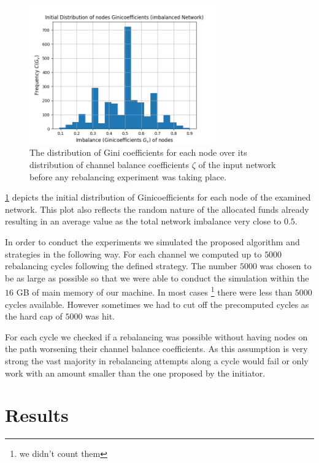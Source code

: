 \documentclass[a4paper]{paper}
\begin{document}
\begin{figure}
 \centering
 \includegraphics[width=8cm]{code/vs/fig/initial_ginis_before_rebalancing.png}
 \caption{The distribution of Gini coefficients for each node over its distribution of channel balance coefficients $\zeta$ of the input network before any rebalancing experiment was taking place.}
 \label{fig:initial_ginis}
\end{figure}
\cref{fig:initial_ginis} depicts the initial distribution of Ginicoefficients for each node of the examined network.
This plot also reflects the random nature of the allocated funds already resulting in an average value as the total network imbalance very close to $0.5$.

In order to conduct the experiments we simulated the proposed algorithm and strategies in the following way.
For each channel we computed up to $5000$ rebalancing cycles following the defined strategy.
The number $5000$ was chosen to be as large as possible so that we were able to conduct the simulation within the $16$ GB of main memory of our machine.
In most cases \footnote{we didn't count them} there were less than $5000$ cycles available.
However sometimes we had to cut off the precomputed cycles as the hard cap of $5000$ was hit.

For each cycle we checked if a rebalancing was possible without having nodes on the path worsening their channel balance coefficients.
As this assumption is very strong the vast majority in rebalancing attempts along a cycle would fail or only work with an amount smaller than the one proposed by the initiator. 
 
\section{Results}
\label{sec:results}
\end{document}
